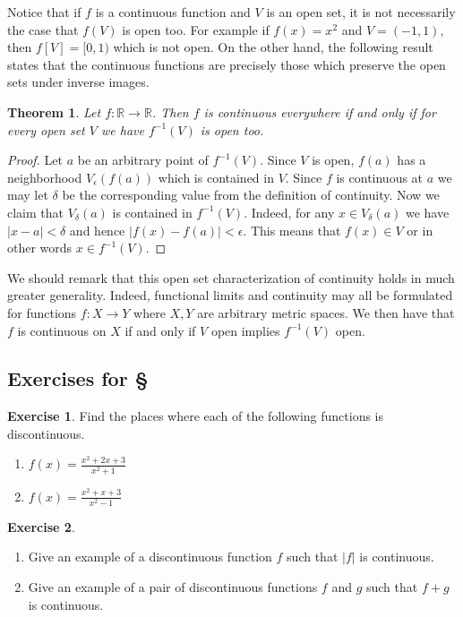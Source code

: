 \documentclass[11pt,oneside]{amsbook}
\newcommand{\R}{\mathbb R}
\theoremstyle{definition}
\newtheorem{exerc}{Exercise}[section]
\theoremstyle{plain}
\newtheorem{thm}{Theorem}[section]
\theoremstyle{definition}
\theoremstyle{remark}
\numberwithin{equation}{section}
\numberwithin{figure}{section}
\begin{document}
Notice that if $f$ is a continuous function and $V$ is an open set, it is not necessarily the case that $f(V)$ is open too. For example if $f(x)=x^2$ and $V=(-1,1)$, then $f[V]=[0,1)$ which is not open. On the other hand, the following result states that the continuous functions are precisely those which preserve the open sets under inverse images.

\begin{thm}
  Let $f\colon\R\to\R$. Then $f$ is continuous everywhere if and only if for every open set $V$ we have $f^{-1}(V)$ is open too.
\end{thm}

\begin{proof}
  Let $a$ be an arbitrary point of $f^{-1}(V)$. Since $V$ is open, $f(a)$ has a neighborhood $V_\epsilon(f(a))$ which is contained in $V$. Since $f$ is continuous at $a$ we may let $\delta$ be the corresponding value from the definition of continuity. Now we claim that $V_\delta(a)$ is contained in $f^{-1}(V)$. Indeed, for any $x\in V_\delta(a)$ we have $|x-a|<\delta$ and hence $|f(x)-f(a)|<\epsilon$. This means that $f(x)\in V$ or in other words $x\in f^{-1}(V)$.
\end{proof}

We should remark that this open set characterization of continuity holds in much greater generality. Indeed, functional limits and continuity may all be formulated for functions $f\colon X\to Y$ where $X,Y$ are arbitrary metric spaces. We then have that $f$ is continuous on $X$ if and only if $V$ open implies $f^{-1}(V)$ open.

\newpage
\subsection*{Exercises for \S \thesection}

\begin{exerc}
  Find the places where each of the following functions is discontinuous.
  \begin{enumerate}
    \item $\displaystyle f(x)=\frac{x^2+2x+3}{x^2+1}$
    \item $\displaystyle f(x)=\frac{x^2+x+3}{x^2-1}$
  \end{enumerate}
\end{exerc}
  
\begin{exerc}
  \begin{enumerate}
    \item Give an example of a discontinuous function $f$ such that $|f|$ is continuous.
    \item Give an example of a pair of discontinuous functions $f$ and $g$ such that $f+g$ is continuous.
  \end{enumerate}
\end{exerc}
  
\end{document}
